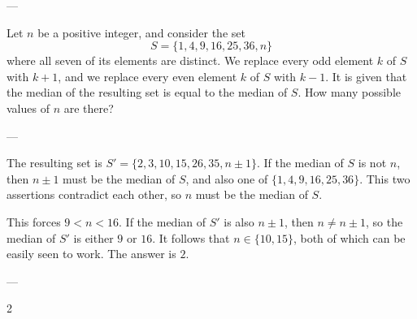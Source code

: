 
---

Let $n$ be a positive integer, and consider the set\[S=\{1,4,9,16,25,36,n\}\]where all seven of its elements are distinct. We replace every odd element $k$ of $S$ with $k+1$, and we replace every even element $k$ of $S$ with $k-1$. It is given that the median of the resulting set is equal to the median of $S$. How many possible values of $n$ are there?

---

The resulting set is $S'=\{2,3,10,15,26,35,n\pm1\}$. If the median of $S$ is not $n$, then $n\pm1$ must be the median of $S$, and also one of $\{1,4,9,16,25,36\}$. This two assertions contradict each other, so $n$ must be the median of $S$.

This forces $9<n<16$. If the median of $S'$ is also $n\pm1$, then $n\ne n\pm1$, so the median of $S'$ is either $9$ or $16$. It follows that $n\in\{10,15\}$, both of which can be easily seen to work. The answer is $2$.

---

2
